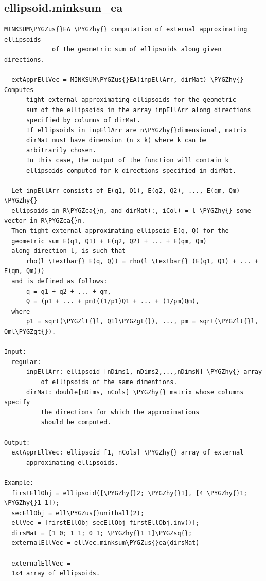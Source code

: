 \documentclass[letterpaper,10pt,english]{sphinxmanual}
\def\PYGZus{\char`\_}
\def\PYGZca{\char`\^}
\def\PYGZlt{\char`\<}
\def\PYGZgt{\char`\>}
\def\PYGZhy{\char`\-}
\def\PYGZsq{\char`\'}
\begin{document}
\subsection{ellipsoid.minksum\_ea}
\label{chap_functions:ellipsoid-minksum-ea}
\begin{Verbatim}[commandchars=\\\{\}]
MINKSUM\PYGZus{}EA \PYGZhy{} computation of external approximating ellipsoids
             of the geometric sum of ellipsoids along given directions.

  extApprEllVec = MINKSUM\PYGZus{}EA(inpEllArr, dirMat) \PYGZhy{} Computes
      tight external approximating ellipsoids for the geometric
      sum of the ellipsoids in the array inpEllArr along directions
      specified by columns of dirMat.
      If ellipsoids in inpEllArr are n\PYGZhy{}dimensional, matrix
      dirMat must have dimension (n x k) where k can be
      arbitrarily chosen.
      In this case, the output of the function will contain k
      ellipsoids computed for k directions specified in dirMat.

  Let inpEllArr consists of E(q1, Q1), E(q2, Q2), ..., E(qm, Qm) \PYGZhy{}
  ellipsoids in R\PYGZca{}n, and dirMat(:, iCol) = l \PYGZhy{} some vector in R\PYGZca{}n.
  Then tight external approximating ellipsoid E(q, Q) for the
  geometric sum E(q1, Q1) + E(q2, Q2) + ... + E(qm, Qm)
  along direction l, is such that
      rho(l \textbar{} E(q, Q)) = rho(l \textbar{} (E(q1, Q1) + ... + E(qm, Qm)))
  and is defined as follows:
      q = q1 + q2 + ... + qm,
      Q = (p1 + ... + pm)((1/p1)Q1 + ... + (1/pm)Qm),
  where
      p1 = sqrt(\PYGZlt{}l, Q1l\PYGZgt{}), ..., pm = sqrt(\PYGZlt{}l, Qml\PYGZgt{}).

Input:
  regular:
      inpEllArr: ellipsoid [nDims1, nDims2,...,nDimsN] \PYGZhy{} array
          of ellipsoids of the same dimentions.
      dirMat: double[nDims, nCols] \PYGZhy{} matrix whose columns specify
          the directions for which the approximations
          should be computed.

Output:
  extApprEllVec: ellipsoid [1, nCols] \PYGZhy{} array of external
      approximating ellipsoids.

Example:
  firstEllObj = ellipsoid([\PYGZhy{}2; \PYGZhy{}1], [4 \PYGZhy{}1; \PYGZhy{}1 1]);
  secEllObj = ell\PYGZus{}unitball(2);
  ellVec = [firstEllObj secEllObj firstEllObj.inv()];
  dirsMat = [1 0; 1 1; 0 1; \PYGZhy{}1 1]\PYGZsq{};
  externalEllVec = ellVec.minksum\PYGZus{}ea(dirsMat)

  externalEllVec =
  1x4 array of ellipsoids.
\end{Verbatim}
\end{document}
